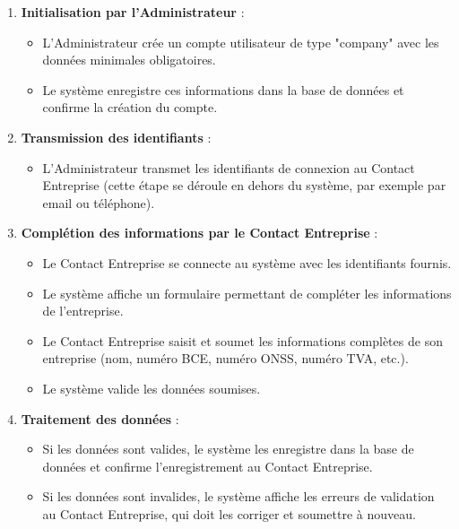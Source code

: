 \begin{enumerate}
  \item \textbf{Initialisation par l'Administrateur} :
    \begin{itemize}[leftmargin=*,label=\textcolor{darkgray}{$\bullet$},itemsep=0.3em]
      \item L'Administrateur crée un compte utilisateur de type "company" avec les données minimales obligatoires.
      \item Le système enregistre ces informations dans la base de données et confirme la création du compte.
    \end{itemize}

  \item \textbf{Transmission des identifiants} :
    \begin{itemize}[leftmargin=*,label=\textcolor{darkgray}{$\bullet$},itemsep=0.3em]
      \item L'Administrateur transmet les identifiants de connexion au Contact Entreprise (cette étape se déroule en dehors du système, par exemple par email ou téléphone).
    \end{itemize}

  \item \textbf{Complétion des informations par le Contact Entreprise} :
    \begin{itemize}[leftmargin=*,label=\textcolor{darkgray}{$\bullet$},itemsep=0.3em]
      \item Le Contact Entreprise se connecte au système avec les identifiants fournis.
      \item Le système affiche un formulaire permettant de compléter les informations de l'entreprise.
      \item Le Contact Entreprise saisit et soumet les informations complètes de son entreprise (nom, numéro BCE, numéro ONSS, numéro TVA, etc.).
      \item Le système valide les données soumises.
    \end{itemize}

  \item \textbf{Traitement des données} :
    \begin{itemize}[leftmargin=*,label=\textcolor{darkgray}{$\bullet$},itemsep=0.3em]
      \item Si les données sont valides, le système les enregistre dans la base de données et confirme l'enregistrement au Contact Entreprise.
      \item Si les données sont invalides, le système affiche les erreurs de validation au Contact Entreprise, qui doit les corriger et soumettre à nouveau.
    \end{itemize}


\end{enumerate}
